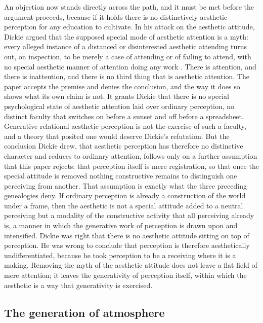 An objection now stands directly across the path, and it must be met before the argument proceeds, because if it holds there is no distinctively aesthetic perception for any education to cultivate. In his attack on the aesthetic attitude, Dickie argued that the supposed special mode of aesthetic attention is a myth: every alleged instance of a distanced or disinterested aesthetic attending turns out, on inspection, to be merely a case of attending or of failing to attend, with no special aesthetic manner of attention doing any work \parencite{dickie1964}. There is attention, and there is inattention, and there is no third thing that is aesthetic attention. The paper accepts the premise and denies the conclusion, and the way it does so shows what its own claim is not. It grants Dickie that there is no special psychological state of aesthetic attention laid over ordinary perception, no distinct faculty that switches on before a sunset and off before a spreadsheet. Generative relational aesthetic perception is not the exercise of such a faculty, and a theory that posited one would deserve Dickie's refutation. But the conclusion Dickie drew, that aesthetic perception has therefore no distinctive character and reduces to ordinary attention, follows only on a further assumption that this paper rejects: that perception itself is mere registration, so that once the special attitude is removed nothing constructive remains to distinguish one perceiving from another. That assumption is exactly what the three preceding genealogies deny. If ordinary perception is already a construction of the world under a frame, then the aesthetic is not a special attitude added to a neutral perceiving but a modality of the constructive activity that all perceiving already is, a manner in which the generative work of perception is drawn upon and intensified. Dickie was right that there is no aesthetic attitude sitting on top of perception. He was wrong to conclude that perception is therefore aesthetically undifferentiated, because he took perception to be a receiving where it is a making. Removing the myth of the aesthetic attitude does not leave a flat field of mere attention; it leaves the generativity of perception itself, within which the aesthetic is a way that generativity is exercised.

\subsection{The generation of atmosphere}
\label{p23:sub:gen-atmosphere}

